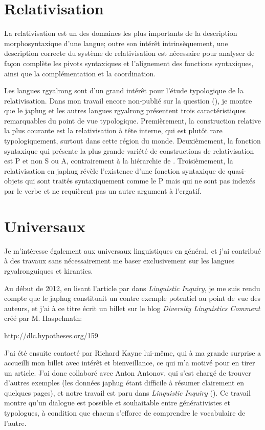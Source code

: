 \documentclass[oldfontcommands,oneside,a4paper,11pt]{memoir}
\begin{document}
\section{Relativisation}
La relativisation est un des domaines les plus importants de la description morphosyntaxique d'une langue; outre son intérêt intrinsèquement, une description correcte du système de  relativisation est nécessaire pour analyser de façon complète les pivots syntaxiques et l'alignement des fonctions syntaxiques, ainsi que la complémentation et la coordination.

Les langues rgyalrong sont d'un grand intérêt pour l'étude typologique de la relativisation. Dans mon travail encore non-publié sur la question (\citealt{jacques14relatives}), je montre que le japhug et les autres langues rgyalrong présentent trois caractéristiques remarquables du point de vue typologique. Premièrement, la construction relative la plus courante est la relativisation à tête interne, qui est plutôt rare typologiquement, surtout dans cette région du monde. Deuxièmement, la fonction syntaxique qui présente la plus grande variété de constructions de relativisation est P et non S ou A, contrairement à la hiérarchie de \citet{keenan77accessibility}. Troisièmement, la relativisation en japhug révèle l'existence d'une fonction syntaxique de quasi-objets qui sont traités syntaxiquement comme le P mais qui ne sont pas indexés par le verbe et ne requièrent pas un autre argument à l'ergatif.

\section{Universaux}
Je m'intéresse également aux universaux linguistiques en général, et j'ai contribué à des travaux sans nécessairement me baser exclusivement sur les langues rgyalronguiques et kiranties.

Au début de 2012, en lisant l'article \citet{harves12need} par dans \textit{Linguistic Inquiry}, je me suis rendu compte que le japhug constituait un contre exemple potentiel au point de vue des auteurs, et j'ai à ce titre écrit un billet sur le blog \textit{Diversity Linguistics Comment} créé par M. Haspelmath: 

http://dlc.hypotheses.org/159

J'ai été ensuite contacté par Richard Kayne lui-même, qui à ma grande surprise a accueilli mon billet avec intérêt et bienveillance, ce qui m'a motivé pour en tirer un article. J'ai donc collaboré avec Anton Antonov, qui s'est chargé de trouver d'autres exemples (les données japhug étant difficile à résumer clairement en quelques pages), et notre travail est paru dans \textit{Linguistic Inquiry} (\citealt{antonov14need}). Ce travail montre qu'un dialogue est possible et souhaitable entre générativistes et typologues, à condition que chacun s'efforce de comprendre le vocabulaire de l'autre.
\end{document}
